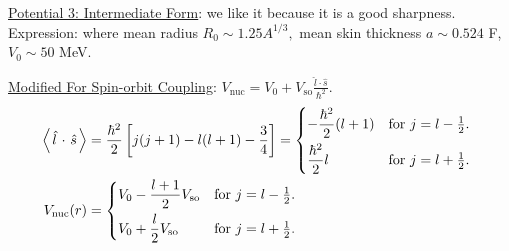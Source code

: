 \documentclass{school-22.101-notes}
\begin{document}
\uline{Potential 3: Intermediate Form}: we like it because it is a good sharpness. Expression: 
where mean radius $R_0 \sim 1.25 A^{1/3},$ mean skin thickness $a \sim 0.524$ F, $V_0 \sim 50$ MeV.  

\uline{Modified For Spin-orbit Coupling}: $V_{\mathrm{nuc}} = V_0 + V_{\mathrm{so}} \frac{\hat{l} \cdot \hat{s} }{\hbar^2}$. 
  \begin{align}
    \expect{\lhat \cdot \shat} &= \frac{\hbar^2}{2} \left[ j(j+1) - l(l+1) - \frac{3}{4} \right] 
    =
    \begin{dcases*}
      - \frac{\hbar^2}{2} (l+1) & for $j = l-\frac{1}{2}$. \\ 
      \frac{\hbar^2}{2} l & for $j = l + \frac{1}{2}$. \\
    \end{dcases*} 
    \\
    V_{\mathrm{nuc}} (r) &= 
    \begin{dcases*}
      V_0 - \frac{l+1}{2} V_{\mathrm{so}} & for $j = l-\frac{1}{2}$. \\ 
      V_0 + \frac{l}{2} V_{\mathrm{so}} & for $j = l + \frac{1}{2}$. \\
    \end{dcases*}
  \end{align}
\end{document}
